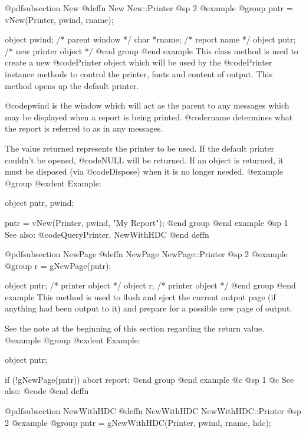 @pdfsubsection {New}
@deffn {New} New::Printer
@sp 2
@example
@group
pntr = vNew(Printer, pwind, rname); 

object  pwind;  /*  parent window       */
char    *rname; /*  report name         */
object  pntr;   /*  new printer object  */
@end group
@end example
This class method is used to create a new @code{Printer} object which
will be used by the @code{Printer} instance methods to control the
printer, fonts and content of output.  This method opens up the
default printer.

@code{pwind} is the window which will act as the parent to any
messages which may be displayed when a report is being printed.
@code{rname} determines what the report is referred to as in any
messages.

The value returned represents the printer to be used.  If the default
printer couldn't be opened, @code{NULL} will be returned.  If an object
is returned, it must be disposed (via @code{Dispose}) when it is no
longer needed.
@example
@group
@exdent Example:

object  pntr, pwind;

pntr = vNew(Printer, pwind, "My Report");
@end group
@end example
@sp 1
See also:  @code{QueryPrinter, NewWithHDC}
@end deffn











@pdfsubsection {NewPage}
@deffn {NewPage} NewPage::Printer
@sp 2
@example
@group
r = gNewPage(pntr); 

object  pntr;   /*  printer object  */
object  r;      /*  printer object  */
@end group
@end example
This method is used to flush and eject the current output page (if anything
had been output to it) and prepare for a possible new page of output.

See the note at the beginning of this section regarding the return value.
@example
@group
@exdent Example:

object  pntr;

if (!gNewPage(pntr))
        abort report;
@end group
@end example
@c @sp 1
@c See also:  @code{}
@end deffn













@pdfsubsection {NewWithHDC}
@deffn {NewWithHDC} NewWithHDC::Printer
@sp 2
@example
@group
pntr = gNewWithHDC(Printer, pwind, rname, hdc); 

